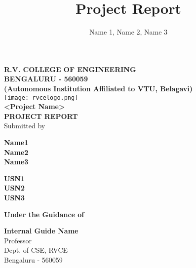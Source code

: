 \title{Project Report}
\author{Name 1, Name 2, Name 3}


\begin{center}
	\textbf {
		\Large R.V. COLLEGE OF ENGINEERING\\
		\Large BENGALURU - 560059\\
		\small(Autonomous Institution Affiliated to VTU, Belagavi)\\[1cm]
	}
	\texttt{[image: rvcelogo.png]}\\[1cm]
	\Large \textbf{<Project Name>}\\[1cm]
	\large \textbf{PROJECT REPORT} \\[0.5cm]
	\normalsize Submitted by\\

	\begin{multicols}{2}
		\begin{flushright}
			\large \textbf{Name1}\\
			\large \textbf{Name2}\\
			\large \textbf{Name3}
		\end{flushright}

		\columnbreak

		\begin{flushleft}
			\large \textbf{USN1}\\
			\large \textbf{USN2}\\
			\large \textbf{USN3}
		\end{flushleft}
	\end{multicols}

	\bigskip

	\normalsize \textbf{Under the Guidance of}\\

	\begin{multicols}{2}

		\normalsize \textbf{Internal Guide Name}\\
		\normalsize Professor\\
		\normalsize Dept. of CSE, RVCE\\
		\normalsize Bengaluru - 560059\\

		\columnbreak


\end{multicols}
\end{center}
